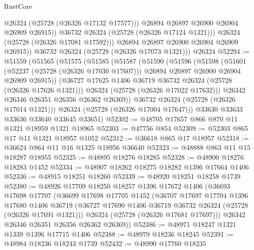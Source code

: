 \begin{lexlean}{RustCore}
\begin{coremodule}
                    @26324
                    (@25728 (@26326 @17132 @17577)))
                  @26894
                  @26897
                  @26900
                  @26904
                  @26909
                  @26915))
              @36732
              @26324
              (@25728 (@26326 @17124 @1321)))
            @26324
            (@25728 (@26326 @17081 @17592)))
          @26894
          @26897
          @26900
          @26904
          @26909
          @26915))
      @36732
      @26324
      (@25728 (@26326 @17073 @1321)))
    @26324
@52294 := @51559
    (@51565
      (@51575
        (@51585
          (@51587
            (@51590
              (@51596
                (@51598
                  (@51601
                    (@52237 (@25728 (@26326 @17030 @17607)))
                    @26894
                    @26897
                    @26900
                    @26904
                    @26909
                    @26915))
                (@36727 @17625 @1406 @36719 @36732 @26324 (@25728 (@26326 @17626 @1321)))
                @26324
                (@25728 (@26326 @17022 @17632)))
              @26342
              @26346
              @26351
              @26356
              @26362
              @26369))
          @36732
          @26324
          (@25728 (@26326 @17014 @1321)))
        @26324
        (@25728 (@26326 @17004 @17647)))
      @33630
      @33633
      @33636
      @33640
      @33645
      @33651)
@52302 := @48705 @17657 @866 @870 @11 @1321 @18959 @1321 @18965
@52303 := @47756 @854
@52309 := @52303 @865 @17 @11 @1321 @18957 @1052
@52312 := @36618 @865 @17 @18957
@52318 := @36624 @864 @11 @16 @1325 @18956 @36640
@52323 := @48888 @863 @11 @15 @18287 @18955
@52325 := @48895 @18276 @18285
@52328 := @48900 @18276 @18283 @1452
@52334 := @48907 @18262 @18275 @18282 @1396 @17664 @1406
@52336 := @48915 @18251 @18260
@52339 := @48920 @18251 @18258 @1739
@52380 := @48926
    @17709
    @18250
    @18257
    @1396
    @17672
    @1406
    (@36693
      @17698
      @17707
      (@36699
        @17698
        @17705
        @1452
        (@36707
          @17697
          @17704
          @1396
          @17680
          @1406
          @36719
          (@36727 @17690 @1406 @36719 @36732 @26324 (@25728 (@26326 @17691 @1321)))
          @26324
          (@25728 (@26326 @17681 @17697)))
        @26342
        @26346
        @26351
        @26356
        @26362
        @26369))
@52386 := @48971 @18247 @1321 @1339 @1396 @17715 @1406
@52388 := @48979 @18236 @18245
@52391 := @48984 @18236 @18243 @1739
@52432 := @48990
    @17760
    @18235

\end{coremodule}
\end{lexlean}
